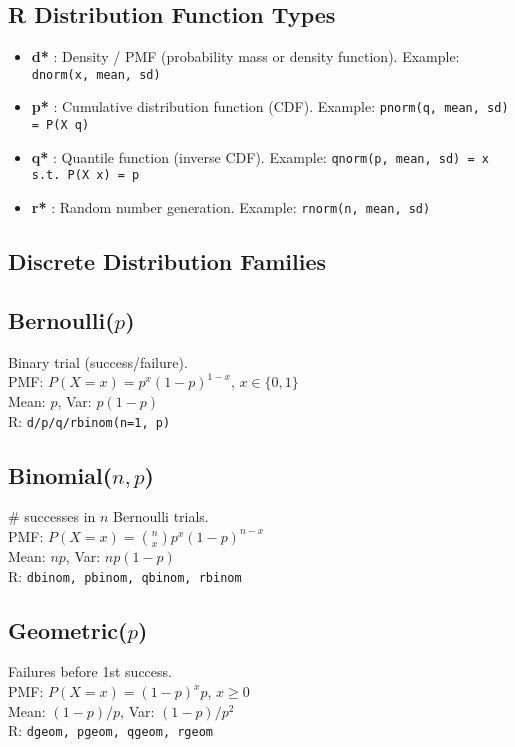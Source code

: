 \documentclass[7pt,landscape]{article}
\begin{document}
\pagestyle{empty}

\begin{multicols}{3}

\section*{R Distribution Function Types}
\begin{itemize}
    \item \textbf{d*} : Density / PMF (probability mass or density function). Example: \texttt{dnorm(x, mean, sd)} 
    \item \textbf{p*} : Cumulative distribution function (CDF). Example: \texttt{pnorm(q, mean, sd) = P(X \le q)}
    \item \textbf{q*} : Quantile function (inverse CDF). Example: \texttt{qnorm(p, mean, sd) = x s.t. P(X \le x) = p}
    \item \textbf{r*} : Random number generation. Example: \texttt{rnorm(n, mean, sd)}
\end{itemize}

\subsection*{Discrete Distribution Families}

\subsection*{Bernoulli($p$)}
Binary trial (success/failure). \\
PMF: $P(X=x)=p^x(1-p)^{1-x}$, $x \in \{0,1\}$ \\
Mean: $p$, Var: $p(1-p)$ \\
R: \texttt{d/p/q/rbinom(n=1, p)}

\subsection*{Binomial($n,p$)}
# successes in $n$ Bernoulli trials. \\
PMF: $P(X=x)=\binom{n}{x}p^x(1-p)^{n-x}$ \\
Mean: $np$, Var: $np(1-p)$ \\
R: \texttt{dbinom, pbinom, qbinom, rbinom}

\subsection*{Geometric($p$)}
Failures before 1st success. \\
PMF: $P(X=x)=(1-p)^x p$, $x \ge 0$ \\
Mean: $(1-p)/p$, Var: $(1-p)/p^2$ \\
R: \texttt{dgeom, pgeom, qgeom, rgeom}


\end{multicols}
\end{document}
